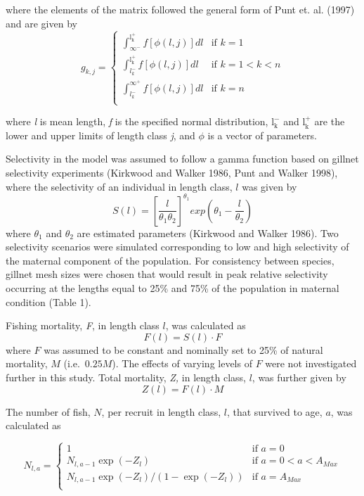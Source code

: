 \documentclass[
]{article}
\begin{document}
where the elements of the matrix followed the general form of Punt et. al. (1997) and are given by\[ g_{k,j} = \left\{
    \begin{array}{ll}
        \int_{{\infty}^-}^{\mathrm{l_{k}^+}}f[\phi(l,j)]dl & \mbox{if }k=1 \\
        \int_{l_{k}^-}^{\mathrm{l_{k}^+}}f[\phi(l,j)]dl &\mbox{if }k=1<k<n \\
\int_{l_{k}^-}^{\mathrm{\infty^+}}f[\phi(l,j)]dl &\mbox{if }k=n \\
    \end{array}
\right.
\]

where \emph{l} is mean length, \emph{f} is the specified normal distribution, \(\mathrm{l_{k}^-}\) and \(\mathrm{l_{k}^+}\) are the lower and upper limits of length class \emph{j}, and \(\phi\) is a vector of parameters.

Selectivity in the model was assumed to follow a gamma function based on gillnet selectivity experiments (Kirkwood and Walker 1986, Punt and Walker 1998), where the selectivity of an individual in length class, \(l\) was given by \[S(l) = \left [ \frac{l}{\theta_1 \theta_2} \right ]^{\theta_1 }exp(\theta_1-\frac{l}{\theta_2}) \] where \(\theta_1\) and \(\theta_2\) are estimated parameters (Kirkwood and Walker 1986). Two selectivity scenarios were simulated corresponding to low and high selectivity of the maternal component of the population. For consistency between species, gillnet mesh sizes were chosen that would result in peak relative selectivity occurring at the lengths equal to 25\% and 75\% of the population in maternal condition (Table 1).

Fishing mortality, \emph{F}, in length class \(l\), was calculated as \[F(l) = S(l) \cdot F\]where \(F\) was assumed to be constant and nominally set to 25\% of natural mortality, \(M\) (i.e.~\(0.25M\)). The effects of varying levels of \(F\) were not investigated further in this study. Total mortality, \emph{Z,} in length class, \(l\), was further given by \[Z(l) = F(l)\cdot{M} \]

The number of fish, \(N\), per recruit in length class, \(l\), that survived to age, \(a\), was calculated as

\[ N_{l,a} = \left\{    \begin{array}{ll}        1 & \mbox{if }a=0 \\        N_{l,a-1}\exp(-Z_{l}) &\mbox{if }a=0<a<A_{Max} \\        N_{l,a-1}\exp(-Z_{l})/(1-\exp(-Z_{l})) &\mbox{if }a=A_{Max} \\    \end{array}\right.\]
\end{document}
